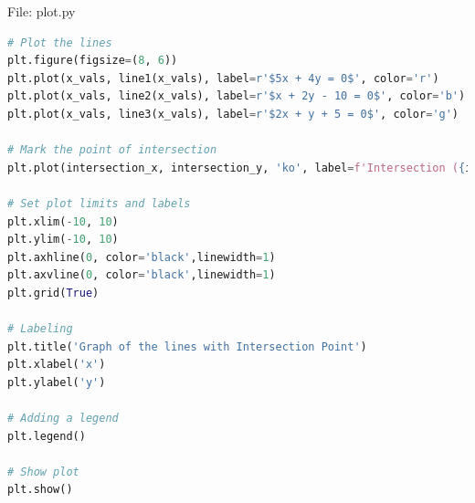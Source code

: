 \documentclass{beamer}
\numberwithin{equation}{section}
\theoremstyle{remark}
\begin{document}
\begin{frame}[fragile]{File: plot.py}
\begin{lstlisting}[language=Python]
# Plot the lines
plt.figure(figsize=(8, 6))
plt.plot(x_vals, line1(x_vals), label=r'$5x + 4y = 0$', color='r')
plt.plot(x_vals, line2(x_vals), label=r'$x + 2y - 10 = 0$', color='b')
plt.plot(x_vals, line3(x_vals), label=r'$2x + y + 5 = 0$', color='g')

# Mark the point of intersection
plt.plot(intersection_x, intersection_y, 'ko', label=f'Intersection ({intersection_x:.2f}, {intersection_y:.2f})')

# Set plot limits and labels
plt.xlim(-10, 10)
plt.ylim(-10, 10)
plt.axhline(0, color='black',linewidth=1)
plt.axvline(0, color='black',linewidth=1)
plt.grid(True)

# Labeling
plt.title('Graph of the lines with Intersection Point')
plt.xlabel('x')
plt.ylabel('y')

# Adding a legend
plt.legend()

# Show plot
plt.show()
\end{lstlisting}
\end{frame}
\end{document}
